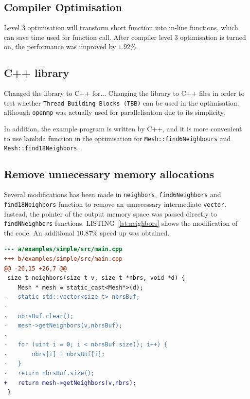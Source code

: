 \documentclass[conference]{IEEEtran}
\newcommand{\lref}[1]{LISTING~\ref{#1}}
\begin{document}
\subsection{Compiler Optimisation}

Level 3 optimisation will transform short function into in-line functions, which can save time used for function call. After compiler level 3 optimisation is turned on, the performance was improved by $1.92\%$.

\subsection{C++ library}

Changed the library to C++ for...
Changing the library to C++ files in order to test whether \texttt{Thread Building Blocks (TBB)} can be used in the optimisation, although \texttt{openmp} \cite{dagum1998openmp} was actually used for parallelisation due to its simplicity.

In addition, the example program is written by C++, and it is more convenient to use lambda function in the optimisation for \texttt{Mesh::find6Neighbours} and \texttt{Mesh::find18Neighbors}.

\subsection{Remove unnecessary memory allocations} \label{sec:vec}

Several modifications has been made in \texttt{neighbors}, \texttt{find6Neighbors} and \texttt{find18Neighbors} function to remove an unnecessary intermediate \texttt{vector}. Instead, the pointer of the output memory space was passed directly to \texttt{findNNeighbors} functions. \lref{lst:neighbors} shows the modification of the code. An additional $10.87\%$ speed up was obtained.

\begin{lstlisting}[float,floatplacement=t,language=diff,label=lst:neighbors,captionpos=b,caption={\texttt{neighbors} code modification}]
--- a/examples/simple/src/main.cpp
+++ b/examples/simple/src/main.cpp
@@ -26,15 +26,7 @@
 size_t neighbors(size_t v, size_t *nbrs, void *d) {
    Mesh * mesh = static_cast<Mesh*>(d);
-   static std::vector<size_t> nbrsBuf;
-
-   nbrsBuf.clear();
-   mesh->getNeighbors(v,nbrsBuf);
-
-   for (uint i = 0; i < nbrsBuf.size(); i++) {
-       nbrs[i] = nbrsBuf[i];
-   }
-   return nbrsBuf.size();
+   return mesh->getNeighbors(v,nbrs);
 }
\end{lstlisting}
\end{document}
